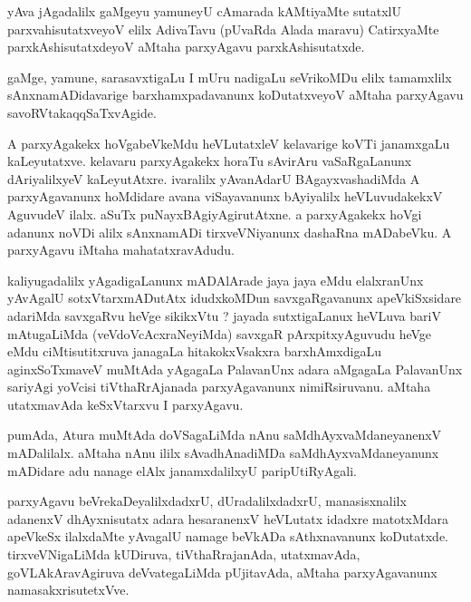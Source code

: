 \documentclass{article}
\begin{document}
\begin{mn}%
yAva jAgadalilx gaMgeyu yamuneyU cAmarada kAMtiyaMte sutatxlU parxvahisutatxveyoV elilx 
AdivaTavu (pUvaRda Alada maravu) CatirxyaMte parxkAshisutatxdeyoV aMtaha parxyAgavu 
parxkAshisutatxde.
\end{mn}

\begin{mn}%
gaMge, yamune, sarasavxtigaLu I mUru nadigaLu seVrikoMDu elilx tamamxlilx sAnxnamADidavarige 
barxhamxpadavanunx koDutatxveyoV aMtaha parxyAgavu savoRVtakaqqSaTxvAgide.
\end{mn}

\begin{mn}%
A parxyAgakekx hoVgabeVkeMdu heVLutatxleV kelavarige koVTi janamxgaLu kaLeyutatxve. kelavaru 
parxyAgakekx horaTu sAvirAru vaSaRgaLanunx dAriyalilxyeV kaLeyutAtxre. ivaralilx yAvanAdarU 
BAgayxvashadiMda A parxyAgavanunx hoMdidare avana viSayavanunx bAyiyalilx heVLuvudakekxV 
AguvudeV ilalx. aSuTx puNayxBAgiyAgirutAtxne. a parxyAgakekx hoVgi adanunx noVDi alilx 
sAnxnamADi tirxveVNiyanunx dashaRna mADabeVku. A parxyAgavu iMtaha mahatatxravAdudu.
\end{mn}

\begin{mn}%
kaliyugadalilx yAgadigaLanunx mADAlArade jaya jaya eMdu elalxranUnx yAvAgalU 
sotxVtarxmADutAtx idudxkoMDun savxgaRgavanunx apeVkiSxsidare adariMda savxgaRvu heVge 
sikikxVtu ? jayada sutxtigaLanux heVLuva bariV mAtugaLiMda (veVdoVcAcxraNeyiMda) savxgaR 
pArxpitxyAguvudu heVge eMdu ciMtisutitxruva janagaLa hitakokxVsakxra barxhAmxdigaLu 
aginxSoTxmaveV muMtAda yAgagaLa PalavanUnx adara aMgagaLa PalavanUnx sariyAgi yoVcisi 
tiVthaRrAjanada parxyAgavanunx nimiRsiruvanu. aMtaha utatxmavAda keSxVtarxvu I parxyAgavu.
\end{mn}

\begin{mn}%
pumAda, Atura muMtAda doVSagaLiMda nAnu saMdhAyxvaMdaneyanenxV mADalilalx. aMtaha nAnu ililx 
sAvadhAnadiMDa saMdhAyxvaMdaneyanunx mADidare adu nanage elAlx janamxdalilxyU 
paripUtiRyAgali.
\end{mn}

\begin{mn}%
parxyAgavu beVrekaDeyalilxdadxrU, dUradalilxdadxrU, manasisxnalilx adanenxV dhAyxnisutatx 
adara hesaranenxV heVLutatx idadxre matotxMdara apeVkeSx ilalxdaMte yAvagalU namage beVkADa 
sAthxnavanunx koDutatxde. tirxveVNigaLiMda kUDiruva, tiVthaRrajanAda, utatxmavAda, 
goVLAkAravAgiruva deVvategaLiMda pUjitavAda, aMtaha parxyAgavanunx namasakxrisutetxVve.
\end{mn}
\end{document}
